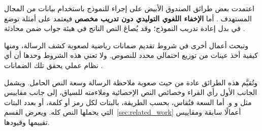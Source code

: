اعتمدت بعض طرائق الصندوق الأبيض على إجراء  للنموذج باستخدام بيانات من المجال المستهدف \cite{yang2020vae,kaptchuk2021meteor,wang2023hi,pang2024fremax}. أما \textbf{الإخفاء اللغوي التوليدي دون تدريب مخصص}  فيعتمد على أمثلة توضع في  بدل إعادة تدريب النموذج؛ وقد يُصاغ النص الناتج في هيئة جواب ضمن محادثة \cite{lin2024zero}.

وتبحث أعمال أخرى في شروط تقديم ضمانات رياضية لصعوبة كشف الرسالة، ومنها كيفية أخذ عينات من توزيع احتمالي محدد للنصوص. ولا تعني هذه الشروط وحدها أن أي نظام عملي يحقق تلك الضمانات \cite{ding2023discop, kaptchuk2021meteor, qi2024provably}.

وتُقيَّم هذه الطرائق عادة من حيث صعوبة ملاحظة الرسالة وسعة النص الحامل. ويشمل الجانب الأول رأي القراء وخصائص النص الإحصائية وملاءمته للسياق، إلى جانب مقاييس مثل  و و. أما السعة فتُقاس، بحسب الطريقة، بالبتات لكل رمز أو كلمة، أو بعدد البتات التي يحملها النص كله. ويعرض القسم~\ref{sec:related_work} أعمالًا سابقة ومقاييس تقييمها وقيودها.
